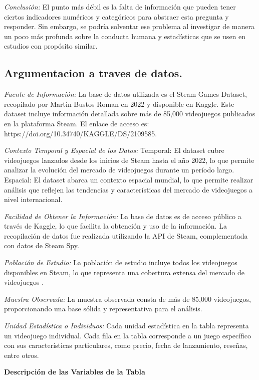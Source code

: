 \documentclass[
  letterpaper,
  DIV=11,
  numbers=noendperiod]{scrreprt}
\begin{document}
\emph{Conclusión:} El punto más débil es la falta de información que
pueden tener ciertos indicadores numéricos y categóricos para abstraer
esta pregunta y responder. Sin embargo, se podría solventar ese problema
al investigar de manera un poco más profunda sobre la conducta humana y
estadísticas que se usen en estudios con propósito similar.

\hypertarget{argumentacion-a-traves-de-datos.}{%
\subsection{Argumentacion a traves de
datos.}\label{argumentacion-a-traves-de-datos.}}

\emph{Fuente de Información:} La base de datos utilizada es el Steam
Games Dataset, recopilado por Martin Bustos Roman en 2022 y disponible
en Kaggle. Este dataset incluye información detallada sobre más de
85,000 videojuegos publicados en la plataforma Steam. El enlace de
acceso es: https://doi.org/10.34740/KAGGLE/DS/2109585.

\emph{Contexto Temporal y Espacial de los Datos:} Temporal: El dataset
cubre videojuegos lanzados desde los inicios de Steam hasta el año 2022,
lo que permite analizar la evolución del mercado de videojuegos durante
un período largo. Espacial: El dataset abarca un contexto espacial
mundial, lo que permite realizar análisis que reflejen las tendencias y
características del mercado de videojuegos a nivel internacional.

\emph{Facilidad de Obtener la Información:} La base de datos es de
acceso público a través de Kaggle, lo que facilita la obtención y uso de
la información. La recopilación de datos fue realizada utilizando la API
de Steam, complementada con datos de Steam Spy.

\emph{Población de Estudio:} La población de estudio incluye todos los
videojuegos disponibles en Steam, lo que representa una cobertura
extensa del mercado de videojuegos .

\emph{Muestra Observada:} La muestra observada consta de más de 85,000
videojuegos, proporcionando una base sólida y representativa para el
análisis.

\emph{Unidad Estadística o Individuos:} Cada unidad estadística en la
tabla representa un videojuego individual. Cada fila en la tabla
corresponde a un juego específico con sus características particulares,
como precio, fecha de lanzamiento, reseñas, entre otros.

\textbf{Descripción de las Variables de la Tabla}
\end{document}
